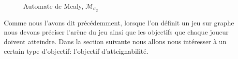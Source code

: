 \begin{exemple}
\begin{figure}
\begin{minipage}[c]{.46\linewidth}
			$ $\\
			$ $\\
			$ $\\
			$ $\\
			$ $\\
			
			
			\caption{Automate de Mealy, $\mathcal{M}_{\sigma_2}$}
			\label{ex:automateMealy}
			
	   \end{minipage}
	\end{figure}



	
\end{exemple}

Comme nous l'avons dit précédemment, lorsque l'on définit un jeu sur graphe nous devons préciser l'arène du jeu ainsi que les objectifs que chaque joueur doivent atteindre. Dans la section suivante nous allons nous intéresser à un certain type d'objectif: l'objectif d'atteignabilité.
